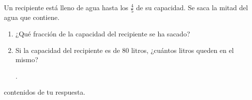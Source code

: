 \documentclass[12pt]{examdesign}
\theoremstyle{plain}
\theoremstyle{definition}
\theoremstyle{remark}
\begin{document}
\begin{shortanswer}[title={Pensar cómo resolver las situaciones problemáticas aplicando fracciones...},
		rearrange=no,resetcounter=no]
        \begin{question}
        	Un recipiente está lleno de agua hasta los $\displaystyle{\frac{4}{5}}$ de su capacidad. Se saca la mitad del agua que contiene.
        	
        	\begin{enumerate}
        		\item ¿Qué fracción de la capacidad del recipiente se ha sacado?
        		
        		\hrulefill
        		
        		\item Si la capacidad del recipiente es de $80$ litros, ¿cuántos litros queden en el mismo?
        		
        		\hrulefill.
        	\end{enumerate}
        	\begin{answer}
        		contenidos de tu respuesta.
        	\end{answer}
        \end{question}
	\end{shortanswer}
\end{document}
